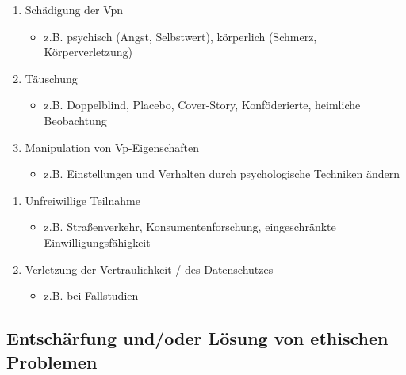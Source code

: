 \documentclass[
]{book}
\providecommand{\tightlist}{%
  \setlength{\itemsep}{0pt}\setlength{\parskip}{0pt}}
\begin{document}
\begin{enumerate}
\def\labelenumi{\arabic{enumi}.}
\tightlist
\item
  Schädigung der Vpn

  \begin{itemize}
  \tightlist
  \item
    z.B. psychisch (Angst, Selbstwert), körperlich (Schmerz, Körperverletzung)
  \end{itemize}
\item
  Täuschung

  \begin{itemize}
  \tightlist
  \item
    z.B. Doppelblind, Placebo, Cover-Story, Konföderierte, heimliche Beobachtung
  \end{itemize}
\item
  Manipulation von Vp-Eigenschaften

  \begin{itemize}
  \tightlist
  \item
    z.B. Einstellungen und Verhalten durch psychologische Techniken ändern
  \end{itemize}
\end{enumerate}

\begin{enumerate}
\def\labelenumi{\arabic{enumi}.}
\setcounter{enumi}{3}
\tightlist
\item
  Unfreiwillige Teilnahme

  \begin{itemize}
  \tightlist
  \item
    z.B. Straßenverkehr, Konsumentenforschung, eingeschränkte Einwilligungsfähigkeit
  \end{itemize}
\item
  Verletzung der Vertraulichkeit / des Datenschutzes

  \begin{itemize}
  \tightlist
  \item
    z.B. bei Fallstudien
  \end{itemize}
\end{enumerate}

\hypertarget{entschuxe4rfung-undoder-luxf6sung-von-ethischen-problemen}{%
\subsection{Entschärfung und/oder Lösung von ethischen Problemen}\label{entschuxe4rfung-undoder-luxf6sung-von-ethischen-problemen}}
\end{document}
